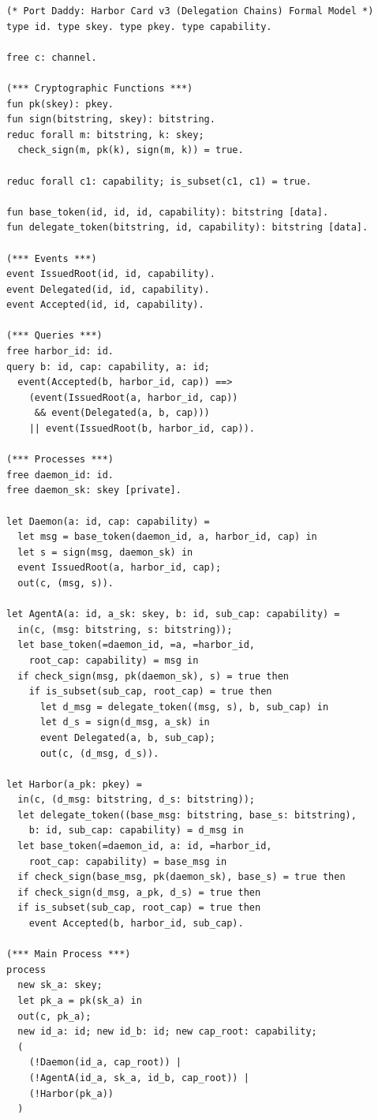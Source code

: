 \documentclass[11pt,a4paper]{article}
\theoremstyle{definition}
\begin{document}
\begin{lstlisting}[caption={\texttt{harbor\_card\_v3\_delegation.pv} --- reflexive-order model (see §\ref{sec:attn-soundness} for the soundness caveat and the enriched v5 proof)}]
(* Port Daddy: Harbor Card v3 (Delegation Chains) Formal Model *)
type id. type skey. type pkey. type capability.

free c: channel.

(*** Cryptographic Functions ***)
fun pk(skey): pkey.
fun sign(bitstring, skey): bitstring.
reduc forall m: bitstring, k: skey;
  check_sign(m, pk(k), sign(m, k)) = true.

reduc forall c1: capability; is_subset(c1, c1) = true.

fun base_token(id, id, id, capability): bitstring [data].
fun delegate_token(bitstring, id, capability): bitstring [data].

(*** Events ***)
event IssuedRoot(id, id, capability).
event Delegated(id, id, capability).
event Accepted(id, id, capability).

(*** Queries ***)
free harbor_id: id.
query b: id, cap: capability, a: id;
  event(Accepted(b, harbor_id, cap)) ==>
    (event(IssuedRoot(a, harbor_id, cap))
     && event(Delegated(a, b, cap)))
    || event(IssuedRoot(b, harbor_id, cap)).

(*** Processes ***)
free daemon_id: id.
free daemon_sk: skey [private].

let Daemon(a: id, cap: capability) =
  let msg = base_token(daemon_id, a, harbor_id, cap) in
  let s = sign(msg, daemon_sk) in
  event IssuedRoot(a, harbor_id, cap);
  out(c, (msg, s)).

let AgentA(a: id, a_sk: skey, b: id, sub_cap: capability) =
  in(c, (msg: bitstring, s: bitstring));
  let base_token(=daemon_id, =a, =harbor_id,
    root_cap: capability) = msg in
  if check_sign(msg, pk(daemon_sk), s) = true then
    if is_subset(sub_cap, root_cap) = true then
      let d_msg = delegate_token((msg, s), b, sub_cap) in
      let d_s = sign(d_msg, a_sk) in
      event Delegated(a, b, sub_cap);
      out(c, (d_msg, d_s)).

let Harbor(a_pk: pkey) =
  in(c, (d_msg: bitstring, d_s: bitstring));
  let delegate_token((base_msg: bitstring, base_s: bitstring),
    b: id, sub_cap: capability) = d_msg in
  let base_token(=daemon_id, a: id, =harbor_id,
    root_cap: capability) = base_msg in
  if check_sign(base_msg, pk(daemon_sk), base_s) = true then
  if check_sign(d_msg, a_pk, d_s) = true then
  if is_subset(sub_cap, root_cap) = true then
    event Accepted(b, harbor_id, sub_cap).

(*** Main Process ***)
process
  new sk_a: skey;
  let pk_a = pk(sk_a) in
  out(c, pk_a);
  new id_a: id; new id_b: id; new cap_root: capability;
  (
    (!Daemon(id_a, cap_root)) |
    (!AgentA(id_a, sk_a, id_b, cap_root)) |
    (!Harbor(pk_a))
  )
\end{lstlisting}
\end{document}
